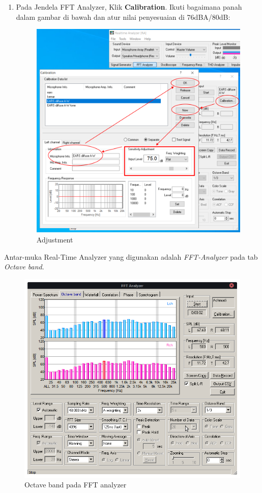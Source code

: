 \documentclass[12pt]{book}
\begin{document}
\begin{enumerate}
    	\newpage
    	\item Pada Jendela FFT Analyzer, Klik \textbf{Calibration}.
    	Ikuti bagaimana panah dalam gambar di bawah dan atur nilai penyesuaian di 76dBA/80dB:

    	\begin{figure}[!ht]
    		\centering
    		\includegraphics[width=\textwidth]{images/kalibrasi/adjustment}
    		\caption{Adjustment}
    	\end{figure}
    \end{enumerate}

	\newpage
	Antar-muka Real-Time Analyzer yang digunakan adalah \textit{FFT-Analyzer} pada tab \textit{Octave band}.

	\begin{figure}[!ht]
		\centering
		\includegraphics[width=\textwidth]{images/kalibrasi/fft}
		\caption{Octave band pada FFT analyzer}
	\end{figure}
\end{document}
